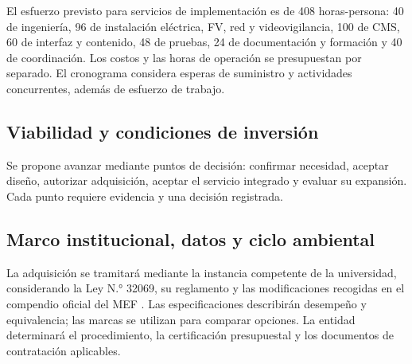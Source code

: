 El esfuerzo previsto para servicios de implementación es de 408 horas-persona: 40 de ingeniería, 96 de instalación eléctrica, FV, red y videovigilancia, 100 de CMS, 60 de interfaz y contenido, 48 de pruebas, 24 de documentación y formación y 40 de coordinación. Los costos y las horas de operación se presupuestan por separado. El cronograma considera esperas de suministro y actividades concurrentes, además de esfuerzo de trabajo.

\subsection{Viabilidad y condiciones de inversión}
Se propone avanzar mediante puntos de decisión: confirmar necesidad, aceptar diseño, autorizar adquisición, aceptar el servicio integrado y evaluar su expansión. Cada punto requiere evidencia y una decisión registrada.

\subsection{Marco institucional, datos y ciclo ambiental}
La adquisición se tramitará mediante la instancia competente de la universidad, considerando la Ley N.° 32069, su reglamento y las modificaciones recogidas en el compendio oficial del MEF \cite{contrataciones}. Las especificaciones describirán desempeño y equivalencia; las marcas se utilizan para comparar opciones. La entidad determinará el procedimiento, la certificación presupuestal y los documentos de contratación aplicables.

